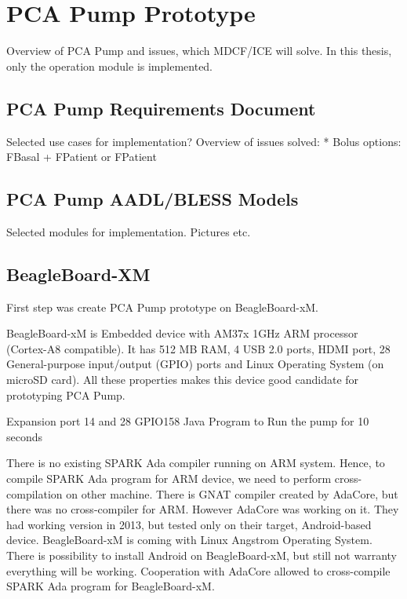 
\cleardoublepage


\chapter{PCA Pump Prototype}
\label{pcapump}

Overview of PCA Pump and issues, which MDCF/ICE will solve.
In this thesis, only the operation module is implemented.


\section{PCA Pump Requirements Document}
\label{pcapump:requirements-doc}
Selected use cases for implementation?
Overview of issues solved: 
* Bolus options: FBasal + FPatient or FPatient


\section{PCA Pump AADL/BLESS Models}
\label{pcapump:aadl-bless-models}
Selected modules for implementation. Pictures etc.


\section{BeagleBoard-XM}
\label{pcapump:beagleboard}
First step was create PCA Pump prototype on BeagleBoard-xM.

BeagleBoard-xM is Embedded device with AM37x 1GHz ARM processor (Cortex-A8 compatible). It has 512 MB RAM, 4 USB 2.0 ports, HDMI port, 28 General-purpose input/output (GPIO) ports and Linux Operating System (on microSD card). All these properties makes this device good candidate for prototyping PCA Pump.

Expansion port 14 and 28
GPIO158
Java Program to Run the pump for 10 seconds

There is no existing SPARK Ada compiler running on ARM system. Hence, to compile SPARK Ada program for ARM device, we need to perform cross-compilation on other machine. There is GNAT compiler \cite{Horn:Thesis} created by AdaCore, but there was no cross-compiler for ARM. However AdaCore was working on it. They had working version in 2013, but tested only on their target, Android-based device. BeagleBoard-xM is coming with Linux Angstrom Operating System. There is possibility to install Android on BeagleBoard-xM, but still not warranty everything will be working. Cooperation with AdaCore allowed to cross-compile SPARK Ada program for BeagleBoard-xM.

